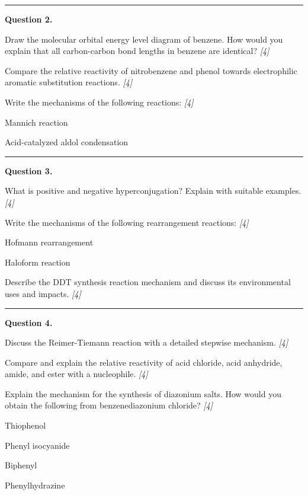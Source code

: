 \documentclass[11pt,a4paper]{article}
\newcommand{\pts}[1]{\hfill   \textit{[#1]}}
\begin{document}
\medskip\rule{\linewidth}{0.2pt}




\noindent   \textbf{Question 2.}

\begin{parts}
  \item Draw the molecular orbital energy level diagram of benzene. How would you explain that all carbon-carbon bond lengths in benzene are identical? \pts{4}
  \item Compare the relative reactivity of nitrobenzene and phenol towards electrophilic aromatic substitution reactions. \pts{4}
  \item Write the mechanisms of the following reactions: \pts{4}
  
\begin{parts}
    \item Mannich reaction
    \item Acid-catalyzed aldol condensation
  \end{parts}
\end{parts}

\medskip\rule{\linewidth}{0.2pt}




\noindent   \textbf{Question 3.}

\begin{parts}
  \item What is positive and negative hyperconjugation? Explain with suitable examples. \pts{4}
  \item Write the mechanisms of the following rearrangement reactions: \pts{4}
  
\begin{parts}
    \item Hofmann rearrangement
    \item Haloform reaction
  \end{parts}
  \item Describe the DDT synthesis reaction mechanism and discuss its environmental uses and impacts. \pts{4}
\end{parts}

\medskip\rule{\linewidth}{0.2pt}




\noindent   \textbf{Question 4.}

\begin{parts}
  \item Discuss the Reimer-Tiemann reaction with a detailed stepwise mechanism. \pts{4}
  \item Compare and explain the relative reactivity of acid chloride, acid anhydride, amide, and ester with a nucleophile. \pts{4}
  \item Explain the mechanism for the synthesis of diazonium salts. How would you obtain the following from benzenediazonium chloride? \pts{4}
  
\begin{parts}
    \item Thiophenol
    \item Phenyl isocyanide
    \item Biphenyl
    \item Phenylhydrazine
  \end{parts}
\end{parts}
\end{document}
